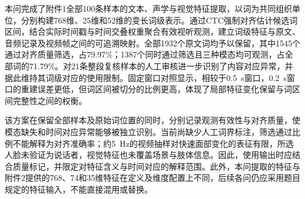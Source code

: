 本问完成了附件1全部100条样本的文本、声学与视觉特征提取，以词为共同组织单位，分别构建768维、25维和52维的变长词级表示。通过CTC强制对齐估计候选词区间，结合实际时间戳与时间交叠权重聚合有效视听观测，建立词级特征与原文、音频记录及视频帧之间的可追溯映射。全部1932个原文词均予以保留，其中1545个通过对齐质量筛选，占79.97\%；1387个同时通过筛选且三种模态均可观测，占全部词的71.79\%。对21条整段复核样本的人工审核进一步识别了内容对应异常，并据此维持其词级对应的使用限制。固定窗口对照显示，相较于0.5~s窗口，0.2~s窗口的重建误差更低，但词区间被切分的比例更高，体现了局部特征变化保留与词区间完整性之间的权衡。

该方案在保留全部样本及原始词位置的同时，分别记录观测有效性与对齐质量，使模态缺失和时间对应异常能够被独立识别。当前尚缺少人工词界标注，筛选通过比例不能解释为对齐准确率；约5~Hz的视频抽样对快速面部变化的表征有限，所选人脸未验证为说话者，视觉特征也未覆盖场景与肢体信息。因此，使用输出时应结合质量标记，并限定对特征含义与时间对应的解释范围。此外，本问提取的特征与附件2提供的768、74和35维特征在定义及维度配置上不同，后续各问仍应采用题目规定的特征输入，不能直接混用或替换。